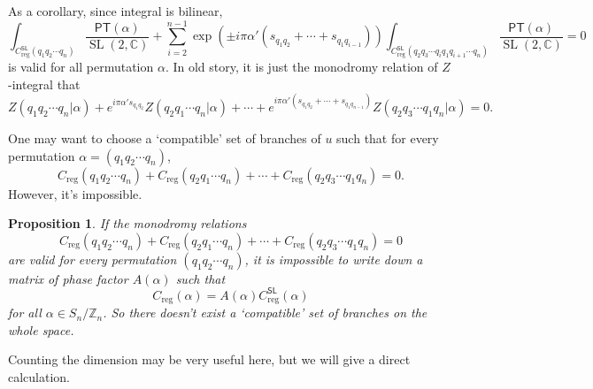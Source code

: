 \documentclass[11pt]{article}
\newcommand{\zz}{\mathbb{Z}}
\theoremstyle{definition}
\theoremstyle{plain}
\newtheorem{pro}[para]{Proposition}
\begin{document}
As a corollary, since integral is bilinear, 
\[
	\int_{C^{\mathsf{SL}}_{\text{reg}}(q_1q_2\cdots q_n)}\frac{\mathsf{PT}(\alpha)}{\operatorname{SL}(2,\mathbb C)}+\sum_{i=2}^{n-1}\exp(\pm i\pi\alpha' (s_{q_1q_2}+\cdots+s_{q_1q_{i-1}}))\int_{C^{\mathsf{SL}}_{\text{reg}}(q_2q_3\cdots q_i q_1 q_{i+1}\cdots q_n)}\frac{\mathsf{PT}(\alpha)}{\operatorname{SL}(2,\mathbb C)}
	=0
\]
is valid for all permutation $\alpha$. In old story, 
it is just the monodromy relation of $Z$-integral that
\[
	Z(q_1q_2\cdots q_n|\alpha)+e^{i\pi\alpha' s_{q_1q_2}}Z(q_2q_1\cdots q_n|\alpha)+\cdots+e^{i\pi\alpha' (s_{q_1q_2}+\cdots+s_{q_1q_{n-1}})}Z(q_2q_3\cdots q_1 q_n|\alpha)=0.
\]


One may want to choose a `compatible' set of branches of $u$ 
such that for every permutation $\alpha=(q_1q_2\cdots q_n)$, 
\[
	C_{\mathrm{reg}}(q_1q_2\cdots q_n)+C_{\mathrm{reg}}(q_2q_1\cdots q_n)
	+\cdots+C_{\mathrm{reg}}(q_2q_3\cdots q_1 q_n)=0.
\]
However, it's impossible.

\begin{pro}\label{pro:1}
If the monodromy relations
\[
	C_{\mathrm{reg}}(q_1q_2\cdots q_n)+C_{\mathrm{reg}}(q_2q_1\cdots q_n)
	+\cdots+C_{\mathrm{reg}}(q_2q_3\cdots q_1 q_n)=0
\]
are valid for every permutation $(q_1q_2\cdots q_n)$, it is impossible to write down a matrix of phase factor
$A(\alpha)$ such that
\[ 
	C_{\mathrm{reg}}(\alpha) = A(\alpha)C_{\mathrm{reg}}^{\mathsf{SL}}(\alpha)
\]
for all $\alpha \in S_n/\zz_n$. So there doesn't exist a `compatible' set 
of branches on the whole space.
\end{pro}

Counting the dimension may be very useful here, but we will give
a direct calculation.

\end{document}
